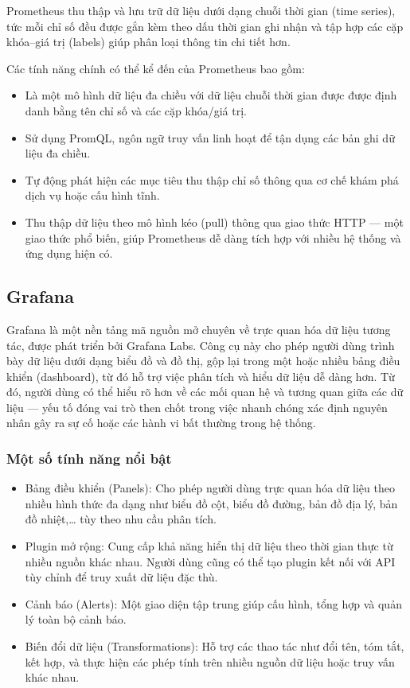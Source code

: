 Prometheus thu thập và lưu trữ dữ liệu dưới dạng chuỗi thời gian (time series), tức mỗi chỉ số đều được gắn kèm theo dấu thời gian ghi nhận và tập hợp các cặp khóa–giá trị (labels) giúp phân loại thông tin chi tiết hơn.

Các tính năng chính có thể kể đến của Prometheus bao gồm:
\begin{itemize}
    \item Là một mô hình dữ liệu đa chiều với dữ liệu chuỗi thời gian được được định danh bằng tên chỉ số và các cặp khóa/giá trị.
    \item Sử dụng PromQL, ngôn ngữ truy vấn linh hoạt để tận dụng các bản ghi dữ liệu đa chiều.
    \item Tự động phát hiện các mục tiêu thu thập chỉ số thông qua cơ chế khám phá dịch vụ hoặc cấu hình tĩnh.
    \item Thu thập dữ liệu theo mô hình kéo (pull) thông qua giao thức HTTP — một giao thức phổ biến, giúp Prometheus dễ dàng tích hợp với nhiều hệ thống và ứng dụng hiện có.
\end{itemize}

\subsection{Grafana}

Grafana \autocite{redhatgrafana} là một nền tảng mã nguồn mở chuyên về trực quan hóa dữ liệu tương tác, được phát triển bởi Grafana Labs. Công cụ này cho phép người dùng trình bày dữ liệu dưới dạng biểu đồ và đồ thị, gộp lại trong một hoặc nhiều bảng điều khiển (dashboard), từ đó hỗ trợ việc phân tích và hiểu dữ liệu dễ dàng hơn. Từ đó, người dùng có thể hiểu rõ hơn về các mối quan hệ và tương quan giữa các dữ liệu — yếu tố đóng vai trò then chốt trong việc nhanh chóng xác định nguyên nhân gây ra sự cố hoặc các hành vi bất thường trong hệ thống.

\subsubsection{Một số tính năng nổi bật}

\begin{itemize}
    \item Bảng điều khiển (Panels): Cho phép người dùng trực quan hóa dữ liệu theo nhiều hình thức đa dạng như biểu đồ cột, biểu đồ đường, bản đồ địa lý, bản đồ nhiệt,… tùy theo nhu cầu phân tích.
    \item Plugin mở rộng: Cung cấp khả năng hiển thị dữ liệu theo thời gian thực từ nhiều nguồn khác nhau. Người dùng cũng có thể tạo plugin kết nối với API tùy chỉnh để truy xuất dữ liệu đặc thù.
    \item Cảnh báo (Alerts): Một giao diện tập trung giúp cấu hình, tổng hợp và quản lý toàn bộ cảnh báo.
    \item Biến đổi dữ liệu (Transformations): Hỗ trợ các thao tác như đổi tên, tóm tắt, kết hợp, và thực hiện các phép tính trên nhiều nguồn dữ liệu hoặc truy vấn khác nhau.
\end{itemize}

